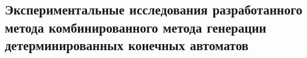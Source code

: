
\subsection{Экспериментальные исследования разработанного метода комбинированного метода генерации детерминированных конечных автоматов}
\label{sec:cegar:results:cegar}


\chresults{\ref{sec:cegar}}
